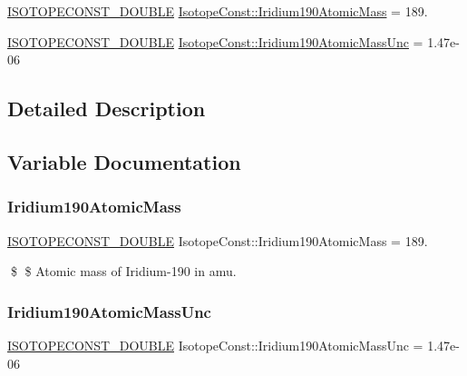 \begin{DoxyCompactItemize}
\item 
\mbox{\hyperlink{group___isotope_const-_macros_ga8f45a7272ce02c0b4c65c44636ed719a}{I\+S\+O\+T\+O\+P\+E\+C\+O\+N\+S\+T\+\_\+\+D\+O\+U\+B\+LE}} \mbox{\hyperlink{group___isotope_const-_iridium-_ir190_ga40e92dc996ab72c20a70cc166d83b4ab}{Isotope\+Const\+::\+Iridium190\+Atomic\+Mass}} = 189.
\item 
\mbox{\hyperlink{group___isotope_const-_macros_ga8f45a7272ce02c0b4c65c44636ed719a}{I\+S\+O\+T\+O\+P\+E\+C\+O\+N\+S\+T\+\_\+\+D\+O\+U\+B\+LE}} \mbox{\hyperlink{group___isotope_const-_iridium-_ir190_ga929f3500d1b5cf46dd4bbb795c423685}{Isotope\+Const\+::\+Iridium190\+Atomic\+Mass\+Unc}} = 1.\+47e-\/06
\end{DoxyCompactItemize}


\subsection{Detailed Description}


\subsection{Variable Documentation}
\mbox{\label{group___isotope_const-_iridium-_ir190_ga40e92dc996ab72c20a70cc166d83b4ab}} 
\subsubsection{\texorpdfstring{Iridium190\+Atomic\+Mass}{Iridium190AtomicMass}}
{\footnotesize\ttfamily \mbox{\hyperlink{group___isotope_const-_macros_ga8f45a7272ce02c0b4c65c44636ed719a}{I\+S\+O\+T\+O\+P\+E\+C\+O\+N\+S\+T\+\_\+\+D\+O\+U\+B\+LE}} Isotope\+Const\+::\+Iridium190\+Atomic\+Mass = 189.}

\$ \$ Atomic mass of Iridium-\/190 in amu. \mbox{\label{group___isotope_const-_iridium-_ir190_ga929f3500d1b5cf46dd4bbb795c423685}} 
\subsubsection{\texorpdfstring{Iridium190\+Atomic\+Mass\+Unc}{Iridium190AtomicMassUnc}}
{\footnotesize\ttfamily \mbox{\hyperlink{group___isotope_const-_macros_ga8f45a7272ce02c0b4c65c44636ed719a}{I\+S\+O\+T\+O\+P\+E\+C\+O\+N\+S\+T\+\_\+\+D\+O\+U\+B\+LE}} Isotope\+Const\+::\+Iridium190\+Atomic\+Mass\+Unc = 1.\+47e-\/06}

